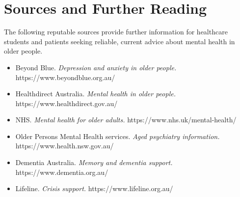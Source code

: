 \section*{Sources and Further Reading}
The following reputable sources provide further information for healthcare students and patients seeking reliable, current advice about mental health in older people.
\begin{itemize}
    \item Beyond Blue. \textit{Depression and anxiety in older people.} https://www.beyondblue.org.au/
    \item Healthdirect Australia. \textit{Mental health in older people.} https://www.healthdirect.gov.au/
    \item NHS. \textit{Mental health for older adults.} https://www.nhs.uk/mental-health/
    \item Older Persons Mental Health services. \textit{Aged psychiatry information.} https://www.health.nsw.gov.au/
    \item Dementia Australia. \textit{Memory and dementia support.} https://www.dementia.org.au/
    \item Lifeline. \textit{Crisis support.} https://www.lifeline.org.au/
\end{itemize}
